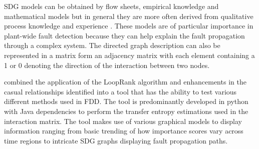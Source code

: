 SDG models can be obtained by flow sheets, empirical knowledge and mathematical models but in general they are more often derived from qualitative process knowledge and experience \cite{yang2010qualitative}. These models are of particular importance in plant-wide fault detection because they can help explain the fault propagation through a complex system. The directed graph description can also be represented in a matrix form an adjacency matrix with each element containing a 1 or 0 denoting the direction of the interaction between two nodes.

\cite{streicher2019plant} combined the application of the LoopRank algorithm and enhancements in the casual relationships identified into a tool that has the ability to test various different methods used in FDD. The tool is predominantly developed in python with Java dependencies to perform the transfer entropy estimations used in the interaction matrix. The tool makes use of various graphical models to display information ranging from basic trending of how importance scores vary across time regions to intricate SDG graphs displaying fault propagation paths.


%

%

